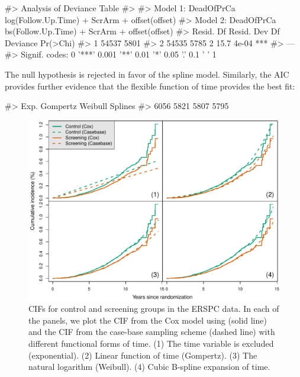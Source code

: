 \documentclass[
]{jss}
\begin{document}
\begin{CodeChunk}

\begin{CodeOutput}
#> Analysis of Deviance Table
#> 
#> Model 1: DeadOfPrCa ~ log(Follow.Up.Time) + ScrArm + offset(offset)
#> Model 2: DeadOfPrCa ~ bs(Follow.Up.Time) + ScrArm + offset(offset)
#>   Resid. Df Resid. Dev Df Deviance Pr(>Chi)    
#> 1     54537       5801                         
#> 2     54535       5785  2     15.7    4e-04 ***
#> ---
#> Signif. codes:  0 '***' 0.001 '**' 0.01 '*' 0.05 '.' 0.1 ' ' 1
\end{CodeOutput}
\end{CodeChunk}

The null hypothesis is rejected in favor of the spline model. Similarly,
the AIC provides further evidence that the flexible function of time
provides the best fit:

\begin{CodeChunk}

\begin{CodeOutput}
#>     Exp. Gompertz  Weibull  Splines 
#>     6056     5821     5807     5795
\end{CodeOutput}
\end{CodeChunk}

\begin{CodeChunk}
\begin{figure}
\includegraphics[width=\textwidth,keepaspectratio=true]{../figures/erspc-cox-cif-1} \caption{CIFs for control and screening groups in the ERSPC data. In each of the panels, we plot the CIF from the Cox model using  (solid line) and the CIF from the case-base sampling scheme (dashed line) with different functional forms of time. (1) The time variable is excluded (exponential). (2) Linear function of time (Gompertz). (3) The natural logarithm (Weibull). (4) Cubic B-spline expansion of time.}\label{fig:erspc-cox-cif}
\end{figure}
\end{CodeChunk}
\end{document}

